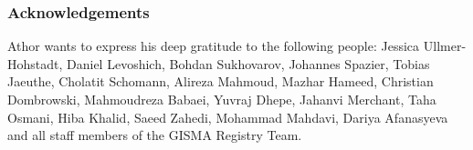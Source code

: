 \subsubsection*{Acknowledgements}

Athor wants to express his deep gratitude to the following people: Jessica
Ullmer-Hohstadt, Daniel Levoshich, Bohdan Sukhovarov, Johannes Spazier, Tobias
Jaeuthe, Cholatit Schomann, Alireza Mahmoud, Mazhar Hameed, Christian
Dombrowski, Mahmoudreza Babaei, Yuvraj Dhepe, Jahanvi Merchant, Taha Osmani,
Hiba Khalid, Saeed Zahedi, Mohammad Mahdavi, Dariya Afanasyeva and all staff
members of the GISMA Registry Team.
